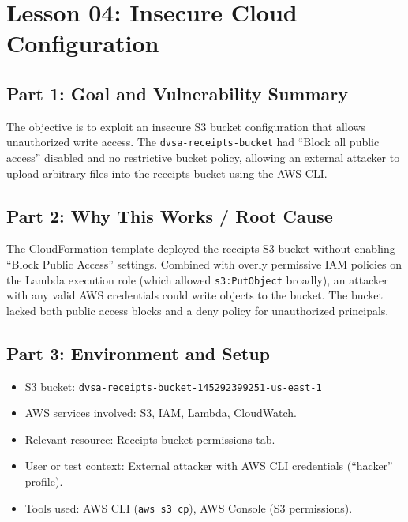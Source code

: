 \documentclass[12pt]{report}
\begin{document}
\clearpage

\chapter{Lesson 04: Insecure Cloud Configuration}

\section{Part 1: Goal and Vulnerability Summary}
The objective is to exploit an insecure S3 bucket configuration that allows unauthorized write access. The \texttt{dvsa-receipts-bucket} had ``Block all public access'' disabled and no restrictive bucket policy, allowing an external attacker to upload arbitrary files into the receipts bucket using the AWS CLI.

\section{Part 2: Why This Works / Root Cause}
The CloudFormation template deployed the receipts S3 bucket without enabling ``Block Public Access'' settings. Combined with overly permissive IAM policies on the Lambda execution role (which allowed \texttt{s3:PutObject} broadly), an attacker with any valid AWS credentials could write objects to the bucket. The bucket lacked both public access blocks and a deny policy for unauthorized principals.

\section{Part 3: Environment and Setup}
\begin{itemize}
  \item S3 bucket: \texttt{dvsa-receipts-bucket-145292399251-us-east-1}
  \item AWS services involved: S3, IAM, Lambda, CloudWatch.
  \item Relevant resource: Receipts bucket permissions tab.
  \item User or test context: External attacker with AWS CLI credentials (``hacker'' profile).
  \item Tools used: AWS CLI (\texttt{aws s3 cp}), AWS Console (S3 permissions).
\end{itemize}
\end{document}
